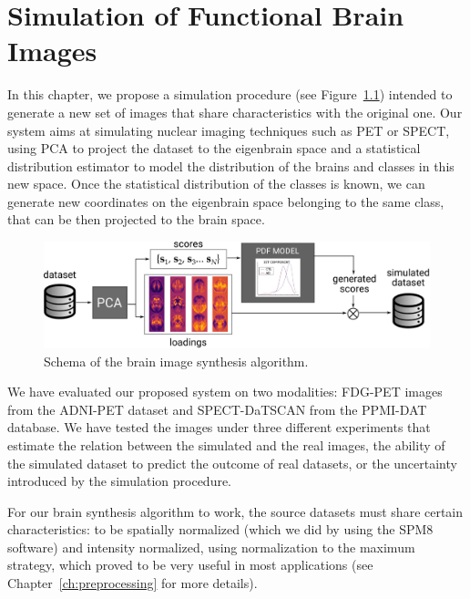 \chapter{Simulation of Functional Brain Images}\label{ch:simulation}
In this chapter, we propose a simulation procedure (see Figure~\ref{fig:simulationSchema}) intended to generate a new set of images that share characteristics with the original one. Our system aims at simulating nuclear imaging techniques such as \ac{PET} or \ac{SPECT}, using \ac{PCA} to project the dataset to the eigenbrain space and a statistical distribution estimator to model the distribution of the brains and classes in this new space. Once the statistical distribution of the classes is known, we can generate new coordinates on the eigenbrain space belonging to the same class, that can be then projected to the brain space.

\begin{figure}[htp]
	\centering
	\includegraphics[width=\textwidth]{Graphics/ch8/SchemaGeneration}
	\caption{Schema of the brain image synthesis algorithm.}
	\label{fig:simulationSchema}
\end{figure} 

We have evaluated our proposed system on two modalities: FDG-\ac{PET} images from the ADNI-PET dataset and \ac{SPECT}-DaTSCAN from the PPMI-DAT database. We have tested the images under three different experiments that estimate the relation between the simulated and the real images, the ability of the simulated dataset to predict the outcome of real datasets, or the uncertainty introduced by the simulation procedure. 

For our brain synthesis algorithm to work, the source datasets must share certain characteristics: to be spatially normalized (which we did by using the SPM8 software) and intensity normalized, using normalization to the maximum strategy, which proved to be very useful in most applications \cite{Martinez-Murcia20129676,martinez2014parametrization} (see Chapter~\ref{ch:preprocessing} for more details).

